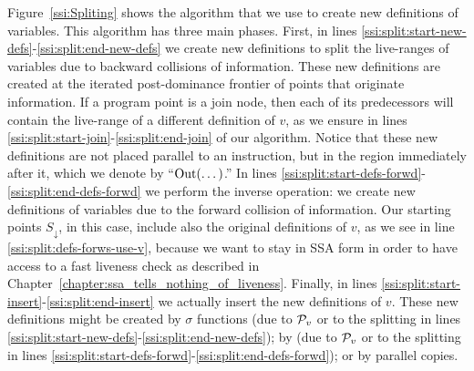 {Figure~\ref{ssi:Spliting} shows the algorithm that we use to create new
definitions of variables.
This algorithm has three main phases.
First, in lines \ref{ssi:split:start-new-defs}-\ref{ssi:split:end-new-defs} we create new definitions to split the live-ranges of variables due to backward collisions of information.
These new definitions are created at the iterated post-dominance frontier of points that originate information.
If a program point is a join node, then each of its predecessors will contain the live-range of a different definition of $v$, as we ensure in lines \ref{ssi:split:start-join}-\ref{ssi:split:end-join} of our algorithm.
Notice that these new definitions are not placed parallel to an instruction, but in the region immediately after it, which we denote by ``$\textrm{Out}(\dots)$.''
In lines \ref{ssi:split:start-defs-forwd}-\ref{ssi:split:end-defs-forwd} we perform the inverse operation: we create new definitions of variables due to the forward collision of information.
Our starting points $S_\downarrow$, in this case, include also the original definitions of $v$, as we see in line \ref{ssi:split:defs-forws-use-v}, because we want to stay in SSA form in order to have access to a fast liveness check as described in Chapter~\ref{chapter:ssa_tells_nothing_of_liveness}.
Finally, in lines \ref{ssi:split:start-insert}-\ref{ssi:split:end-insert} we actually insert the new definitions of $v$.
These new definitions might be created by $\sigma$ functions (due to ${\cal P}_v$ or to the splitting in lines \ref{ssi:split:start-new-defs}-\ref{ssi:split:end-new-defs}); by \phifuns (due to ${\cal P}_v$ or to the splitting in lines \ref{ssi:split:start-defs-forwd}-\ref{ssi:split:end-defs-forwd}); or by parallel copies.

\begin{figure}[htbp]
  \begin{algorithm}[H]
  \end{algorithm}


\end{figure}}
